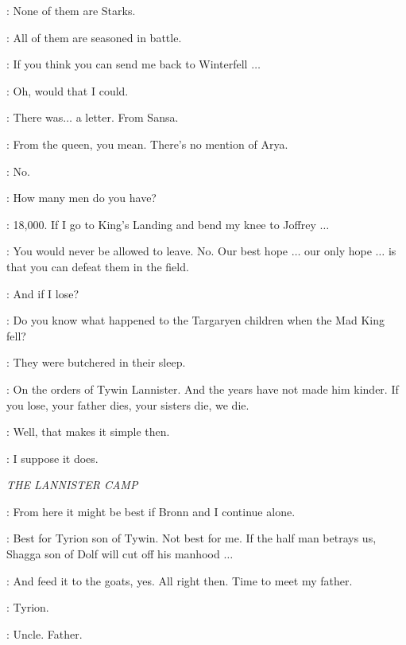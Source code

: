 \ROBB: None of them are Starks. 

\CATELYN: All of them are seasoned in battle. 

\ROBB: If you think you can send me back to Winterfell $\ldots$  

\CATELYN: Oh, would that I could. 

\ROBB: There was$\ldots$ a letter. From Sansa. 

\CATELYN: From the queen, you mean.  There's no mention of Arya. 

\ROBB: No. 

\CATELYN: How many men do you have? 

\ROBB: 18,000. If I go to King's Landing and bend my knee to Joffrey $\ldots$  

\CATELYN: You would never be allowed to leave. No. Our best hope $\ldots$ our only hope $\ldots$ is that you can defeat them in the field. 

\ROBB: And if I lose? 

\CATELYN: Do you know what happened to the Targaryen children when the Mad King fell?

\ROBB: They were butchered in their sleep.

\CATELYN: On the orders of Tywin Lannister. And the years have not made him kinder. If you lose, your father dies, your sisters die, we die. 

\ROBB: Well, that makes it simple then. 

\CATELYN: I suppose it does. 


\scene

\textit{THE LANNISTER CAMP} 


\TYRION: From here it might be best if Bronn and I continue alone. 

\SHAGGA: Best for Tyrion son of Tywin. Not best for me. If the half man betrays us, Shagga son of Dolf will cut off his manhood $\ldots$  

\TYRION: And feed it to the goats, yes. All right then. Time to meet my father. 


\KEVAN: Tyrion. 

\TYRION: Uncle. Father. 

